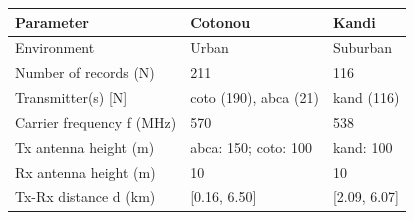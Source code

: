 \begin{tabular}{lll}
\toprule
Parameter & Cotonou & Kandi \\
\midrule
Environment & Urban & Suburban \\
Number of records (N) & 211 & 116 \\
Transmitter(s) [N] & coto (190), abca (21) & kand (116) \\
Carrier frequency f (MHz) & 570 & 538 \\
Tx antenna height (m) & abca: 150; coto: 100 & kand: 100 \\
Rx antenna height (m) & 10 & 10 \\
Tx-Rx distance d (km) & [0.16, 6.50] & [2.09, 6.07] \\
\bottomrule
\end{tabular}
